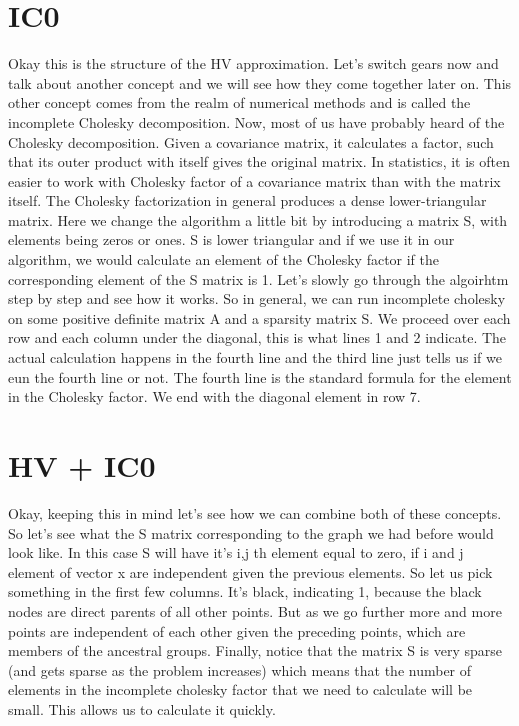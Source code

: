 \documentclass[14pt]{extarticle} %
\begin{document}
\newpage
\section*{IC0}



Okay this is the structure of the HV approximation. Let's switch gears now and talk about another concept and we will see how they come together later on. This other concept comes from the realm of numerical methods and is called the incomplete Cholesky decomposition. Now, most of us have probably heard of the Cholesky decomposition. Given a covariance matrix, it calculates a factor, such that its outer product with itself gives the original matrix. In statistics, it is often easier to work with Cholesky factor of a covariance matrix than with the matrix itself. The Cholesky factorization in general produces a dense lower-triangular matrix. Here we change the algorithm a little bit by introducing a matrix S, with elements being zeros or ones. S is lower triangular and if we use it in our algorithm, we would calculate an element of the Cholesky factor if the corresponding element of the S matrix is 1. Let's slowly go through the algoirhtm step by step and see how it works. So in general, we can run incomplete cholesky on some positive definite matrix A and a sparsity matrix S. We proceed over each row and each column under the diagonal, this is what lines 1 and 2 indicate. The actual calculation happens in the fourth line and the third line just tells us if we eun the fourth line or not. The fourth line is the standard formula for the element in the Cholesky factor. We end with the diagonal element in row 7.
\newpage


\section*{HV + IC0}
Okay, keeping this in mind let's see how we can combine both of these concepts. So let's see what the S matrix corresponding to the graph we had before would look like. In this case S will have it's i,j th element equal to zero, if i and j element of vector x are independent given the previous elements. So let us pick something in the first few columns. It's black, indicating 1, because the black nodes are direct parents of all other points. But as we go further more and more points are independent of each other given the preceding points, which are members of the ancestral groups. Finally, notice that the matrix S is very sparse (and gets sparse as the problem increases) which means that the number of elements in the incomplete cholesky factor that we need to calculate will be small. This allows us to calculate it quickly.
\end{document}

